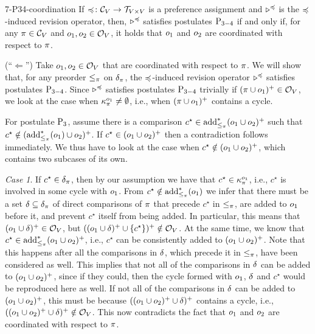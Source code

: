\begin{thm}{}{7-P34-coordination}
	If $\preccurlyeq\colon\mathcal{C}_V\rightarrow\mathcal{T}_{V\times V}$ 
	is a preference assignment and $\triangleright^\preccurlyeq$ 
	is the $\preccurlyeq$-induced revision operator,
	then, 
	$\triangleright^\preccurlyeq$ satisfies postulates $\mathrm{P}_{3-4}$
	if and only if, 
	for any $\pi\in\mathcal{C}_V$ and $o_1,o_2\in\mathcal{O}_V$, 
	it holds that $o_1$ and $o_2$ are coordinated with respect to $\pi$.
\end{thm}
\begin{prf*}{}{}%
	(``$\Leftarrow$'')
	Take $o_1,o_2\in\mathcal{O}_V$ that are coordinated with respect to $\pi$.
	We will show that, for any preorder $\le_\pi$ on $\delta_\pi$,
	the $\preccurlyeq$-induced revision operator $\triangleright^\preccurlyeq$ satisfies postulates $\mathrm{P}_{3-4}$.
	Since 
	$\triangleright^\preccurlyeq$ satisfies postulates $\mathrm{P}_{3-4}$ trivially
	if $(\pi\cup o_1)^+\in\mathcal{O}_V$,
	we look at the case when $\kappa_{\pi}^{o_1}\neq\emptyset$,
	i.e., when $(\pi\cup o_1)^+$ contains a cycle.
	
	For postulate $\mathrm{P}_{3}$, assume there is a 
	comparison $c^\star\in{\operatorname{add}}^\ast_{\le_\pi}(o_1\cup o_2)^+$
	such that $c^\star\notin({\operatorname{add}}^\ast_{\le_\pi}(o_1)\cup o_2)^+$.
	If $c^\star\in(o_1\cup o_2)^+$ then a contradiction follows immediately.
	We thus have to look 
	at the case when $c^\star\notin(o_1\cup o_2)^+$, which contains two subcases 
	of its own.

	\emph{Case 1}. 
	If $c^\star\in\delta_\pi$, then by our assumption 
	we have that $c^\star\in\kappa_{\pi}^{o_1}$, i.e., 
	$c^\star$ is involved in some cycle with $o_1$.
	From $c^\star\notin{\operatorname{add}}^\ast_{\le_\pi}(o_1)$ 
	we infer that there must be a set $\delta\subseteq\delta_\pi$
	of direct comparisons of $\pi$ 
	that precede $c^\star$ in $\le_\pi$, are added to $o_1$ before it, 
	and prevent $c^\star$ itself from being added.
	In particular, this means that $(o_1\cup\delta)^+\in\mathcal{O}_V$, 
	but $((o_1\cup\delta)^+\cup\{c^\star\})^+\notin\mathcal{O}_V$. 
	At the same time, we know that $c^\star\in{\operatorname{add}}^\ast_{\le_\pi}(o_1\cup o_2)^+$,
	i.e., $c^\star$ can be consistently added to $(o_1\cup o_2)^+$.
	Note that this happens after all the comparisons in $\delta$, which precede it in $\le_\pi$,
	have been considered as well.
	This implies that not all of the comparisons in $\delta$ can be added to $(o_1\cup o_2)^+$,
	since if they could, then the cycle formed with $o_1$, $\delta$ and $c^\star$ would be reproduced here
	as well. 
	If not all of the comparisons in $\delta$ can be added to $(o_1\cup o_2)^+$,
	this must be because $((o_1\cup o_2)^+\cup\delta)^+$ contains a cycle,
	i.e., $((o_1\cup o_2)^+\cup\delta)^+\notin\mathcal{O}_V$.
	This now contradicts the fact that $o_1$ and $o_2$ are coordinated with respect to $\pi$.
	

\end{prf*}
